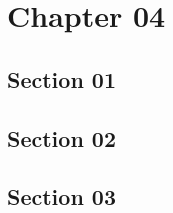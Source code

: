 \chapter{Chapter 04}
\section{Section 01}
\lipsum[1-5]
\section{Section 02}
\lipsum[1-5]
\section{Section 03}
\lipsum[1-5]